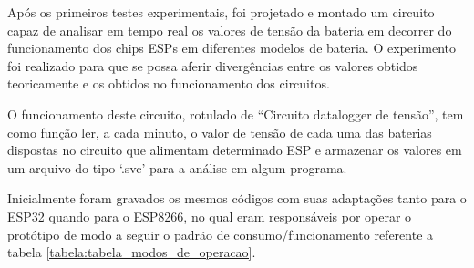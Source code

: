 {
Após os primeiros testes experimentais, foi projetado e montado um circuito capaz de analisar em tempo real os valores de tensão da bateria em decorrer do funcionamento dos chips ESPs em diferentes modelos de bateria. O experimento foi realizado para que se possa aferir divergências entre os valores obtidos teoricamente e os obtidos no funcionamento dos circuitos.
}

{
O funcionamento deste circuito, rotulado de “Circuito datalogger de tensão”, tem como função ler, a cada minuto, o valor de tensão de cada uma das baterias dispostas no circuito que alimentam determinado ESP e armazenar os valores em um arquivo do tipo ‘.svc’ para a análise em algum programa.
}

{
Inicialmente foram gravados os mesmos códigos com suas adaptações tanto para o ESP32 quando para o ESP8266, no qual eram responsáveis por operar o protótipo de modo a seguir o padrão de consumo/funcionamento referente a tabela \ref{tabela:tabela_modos_de_operacao}.
}

